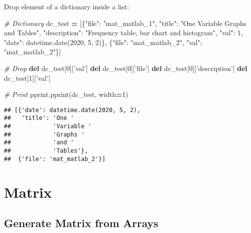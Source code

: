 \documentclass[
]{book}
\newenvironment{Shaded}{\begin{snugshade}}{\end{snugshade}}
\newcommand{\CommentTok}[1]{\textcolor[rgb]{0.56,0.35,0.01}{\textit{#1}}}
\newcommand{\DecValTok}[1]{\textcolor[rgb]{0.00,0.00,0.81}{#1}}
\newcommand{\KeywordTok}[1]{\textcolor[rgb]{0.13,0.29,0.53}{\textbf{#1}}}
\newcommand{\NormalTok}[1]{#1}
\newcommand{\OperatorTok}[1]{\textcolor[rgb]{0.81,0.36,0.00}{\textbf{#1}}}
\newcommand{\StringTok}[1]{\textcolor[rgb]{0.31,0.60,0.02}{#1}}
\begin{document}
Drop element of a dictionary inside a list:

\begin{Shaded}
\begin{Highlighting}[]
\CommentTok{# Dictionary}
\NormalTok{dc_test }\OperatorTok{=}\NormalTok{ [\{}\StringTok{"file"}\NormalTok{: }\StringTok{"mat_matlab_1"}\NormalTok{,}
           \StringTok{"title"}\NormalTok{: }\StringTok{"One Variable Graphs and Tables"}\NormalTok{,}
           \StringTok{"description"}\NormalTok{: }\StringTok{"Frequency table, bar chart and histogram"}\NormalTok{,}
           \StringTok{"val"}\NormalTok{: }\DecValTok{1}\NormalTok{,}
           \StringTok{"date"}\NormalTok{: datetime.date(}\DecValTok{2020}\NormalTok{, }\DecValTok{5}\NormalTok{, }\DecValTok{2}\NormalTok{)\},}
\NormalTok{           \{}\StringTok{"file"}\NormalTok{: }\StringTok{"mat_matlab_2"}\NormalTok{, }
            \StringTok{"val"}\NormalTok{: }\StringTok{"mat_matlab_2"}\NormalTok{\}]}

\CommentTok{# Drop           }
\KeywordTok{del}\NormalTok{ dc_test[}\DecValTok{0}\NormalTok{][}\StringTok{'val'}\NormalTok{]}
\KeywordTok{del}\NormalTok{ dc_test[}\DecValTok{0}\NormalTok{][}\StringTok{'file'}\NormalTok{]}
\KeywordTok{del}\NormalTok{ dc_test[}\DecValTok{0}\NormalTok{][}\StringTok{'description'}\NormalTok{]}
\KeywordTok{del}\NormalTok{ dc_test[}\DecValTok{1}\NormalTok{][}\StringTok{'val'}\NormalTok{]}

\CommentTok{# Print}
\NormalTok{pprint.pprint(dc_test, width}\OperatorTok{=}\DecValTok{1}\NormalTok{)}
\end{Highlighting}
\end{Shaded}

\begin{verbatim}
## [{'date': datetime.date(2020, 5, 2),
##   'title': 'One '
##            'Variable '
##            'Graphs '
##            'and '
##            'Tables'},
##  {'file': 'mat_matlab_2'}]
\end{verbatim}

\hypertarget{matrix}{%
\section{Matrix}\label{matrix}}

\hypertarget{generate-matrix-from-arrays}{%
\subsection{Generate Matrix from Arrays}\label{generate-matrix-from-arrays}}
\end{document}
